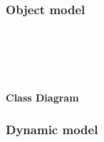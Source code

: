 \subsubsection{Object model}
		\\[1in]
	\begin{center}	
		\\[.2in]
		\\
	\end{center}	
	\textbf{Class Diagram} \\
	\pagebreak

\subsubsection{Dynamic model}

